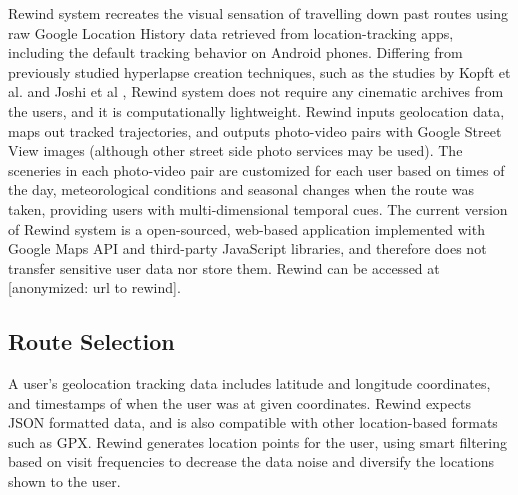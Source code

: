 \documentclass{sigchi}
\begin{document}
Rewind system recreates the visual sensation of travelling down past routes using raw Google Location History data retrieved from location-tracking apps, including the default tracking behavior on Android phones. Differing from previously studied hyperlapse creation techniques, such as the studies by Kopft et al. and Joshi et al \cite{Kopf:2014:FHV:2601097.2601195, Joshi:2015:RHC:2809654.2766954}, Rewind system does not require any cinematic archives from the users, and it is computationally lightweight. Rewind inputs geolocation data, maps out tracked trajectories, and outputs photo-video pairs with Google Street View images (although other street side photo services may be used). The sceneries in each photo-video pair are customized for each user based on times of the day, meteorological conditions and seasonal changes when the route was taken, providing users with multi-dimensional temporal cues. The current version of Rewind system is a open-sourced, web-based application implemented with Google Maps API and third-party JavaScript libraries, and therefore does not transfer sensitive user data nor store them. Rewind can be accessed at [anonymized: url to rewind].  %


\subsection{Route Selection}
A user's geolocation tracking data includes latitude and longitude coordinates, and timestamps of when the user was at given coordinates. Rewind expects JSON formatted data, and is also compatible with other location-based formats such as GPX. Rewind generates location points for the user, using smart filtering based on visit frequencies to decrease the data noise and diversify the locations shown to the user.
\end{document}
